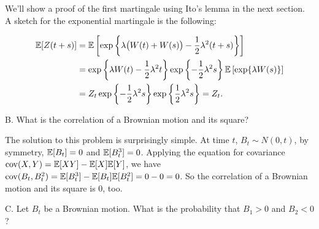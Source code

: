 
We'll show a proof of the first martingale using Ito's lemma in the next section. A
sketch for the exponential martingale is the following:\footnotemark[2]

\[
\begin{aligned}
\mathbb{E}[Z(t+s)]
 &=\mathbb{E}\left[\exp\left\{\lambda\bigl(W(t)+W(s)\bigr)-\frac{1}{2}\lambda^2(t+s)\right\}\right]\\
 &=\exp\left\{\lambda W(t)-\frac{1}{2}\lambda^2t\right\}
   \exp\left\{-\frac{1}{2}\lambda^2s\right\}
   \mathbb{E}\left[\exp\{\lambda W(s)\}\right]\\
 &=Z_t\exp\left\{-\frac{1}{2}\lambda^2s\right\}
   \exp\left\{\frac{1}{2}\lambda^2s\right\}=Z_t.
\end{aligned}
\]

\begin{problem}{B. What is the correlation of a Brownian motion and its square?}
\end{problem}

\begin{solution}
The solution to this problem is surprisingly simple. At time $t$, $B_t\sim N(0,t)$, by
symmetry, $\mathbb{E}[B_t]=0$ and $\mathbb{E}[B_t^3]=0$. Applying the equation for covariance
$\operatorname{cov}(X,Y)=\mathbb{E}[XY]-\mathbb{E}[X]\mathbb{E}[Y]$, we have
$\operatorname{cov}(B_t,B_t^2)=\mathbb{E}[B_t^3]-\mathbb{E}[B_t]\mathbb{E}[B_t^2]=0-0=0$.
So the correlation of a Brownian motion and its square is 0, too.

\end{solution}

\begin{problem}{C. Let $B_t$ be a Brownian motion. What is the probability that $B_1>0$ and
$B_2<0$?}
\end{problem}

